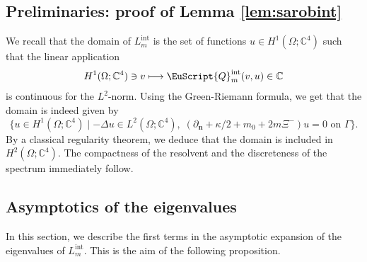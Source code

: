 \documentclass[JEP,XML,SOM,Unicode]{cedram}
\let\mathcal \EuScript
\newcommand\mto{\mathchoice{\longmapsto}{\mapsto}{\mapsto}{\mapsto}}
\newcommand{\cQ}{\mathcal{Q}}
\newcommand{\intt}{\mathrm{int}}
\let\sep\mid
\theoremstyle{plain}
\theoremstyle{definition}
\newcommand{\CC}{\mathbb{C}}
\newcommand{\bn}{{\boldsymbol n}}
\let\pa\partial
\begin{document}
\subsection{Preliminaries: proof of Lemma \ref{lem:sarobint}}\label{sec.Lintdef}
We recall that the domain of $L_m^\intt$ is the set of functions $u\in H^1(\Omega; \CC^4)$ such that the linear application
\[ H^1(\Omega; \CC^4)\ni v\mto \cQ_m^\intt(v,u)\in\CC\]
is continuous for the $L^2$-norm. Using the Green-Riemann formula, we get that the domain is indeed given by
\[\{u\in H^1(\Omega; \CC^4) \sep -\Delta u\in L^2(\Omega; \CC^4),\; (\pa_\bn + \kappa/2+m_0 + 2m\Xi^{-})u=0 \mbox{ on } \Gamma\}.\]
By a classical regularity theorem, we deduce that the domain is included in $H^2(\Omega;\CC^4)$.
The compactness of the resolvent and the discreteness of the spectrum immediately follow.
\subsection{Asymptotics of the eigenvalues}
In this section, we describe the first terms in the asymptotic expansion of the eigenvalues of $L_m^\intt$. This is the aim of the following proposition.
\end{document}
